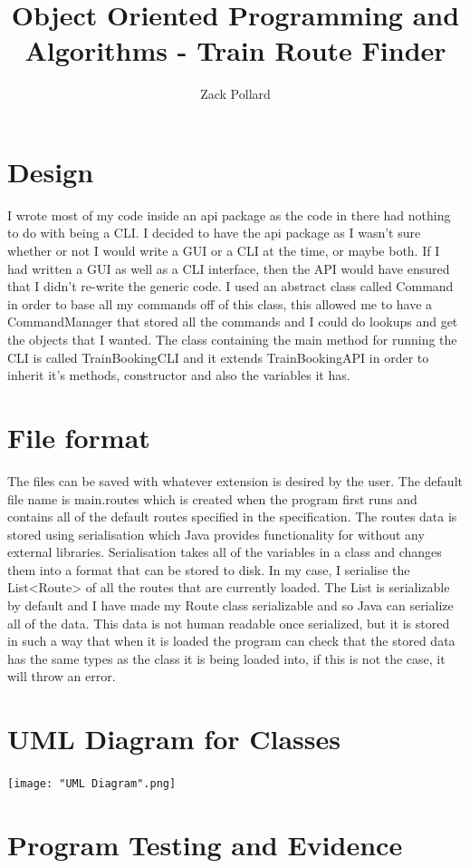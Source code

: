 \documentclass[10pt, a4paper]{article}
\begin{document}

\title{Object Oriented Programming and Algorithms - Train Route Finder}
\author{Zack Pollard}
\maketitle
\section{Design}
I wrote most of my code inside an api package as the code in there had nothing to do with being a CLI. I decided to have the api package as I wasn't sure whether or not I would write a GUI or a CLI at the time, or maybe both. If I had written a GUI as well as a CLI interface, then the API would have ensured that I didn't re-write the generic code. I used an abstract class called Command in order to base all my commands off of this class, this allowed me to have a CommandManager that stored all the commands and I could do lookups and get the objects that I wanted. The class containing the main method for running the CLI is called TrainBookingCLI and it extends TrainBookingAPI in order to inherit it's methods, constructor and also the variables it has.
\section{File format}
The files can be saved with whatever extension is desired by the user. The default file name is main.routes which is created when the program first runs and contains all of the default routes specified in the specification. The routes data is stored using serialisation which Java provides functionality for without any external libraries. Serialisation takes all of the variables in a class and changes them into a format that can be stored to disk. In my case, I serialise the List<Route> of all the routes that are currently loaded. The List is serializable by default and I have made my Route class serializable and so Java can serialize all of the data. This data is not human readable once serialized, but it is stored in such a way that when it is loaded the program can check that the stored data has the same types as the class it is being loaded into, if this is not the case, it will throw an error.
\newpage
\section{UML Diagram for Classes}
\texttt{[image: "UML Diagram".png]}
\newpage
\section{Program Testing and Evidence}
\end{document}
